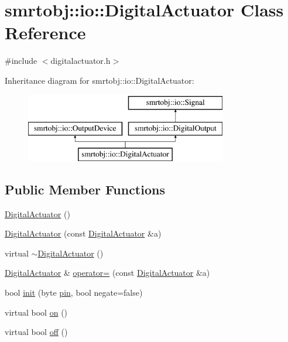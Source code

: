 \hypertarget{classsmrtobj_1_1io_1_1_digital_actuator}{}\section{smrtobj\+:\+:io\+:\+:Digital\+Actuator Class Reference}
\label{classsmrtobj_1_1io_1_1_digital_actuator}


{\ttfamily \#include $<$digitalactuator.\+h$>$}

Inheritance diagram for smrtobj\+:\+:io\+:\+:Digital\+Actuator\+:\begin{figure}[H]
\begin{center}
\leavevmode
\includegraphics[height=3.000000cm]{classsmrtobj_1_1io_1_1_digital_actuator}
\end{center}
\end{figure}
\subsection*{Public Member Functions}
\begin{DoxyCompactItemize}
\item 
\hyperlink{classsmrtobj_1_1io_1_1_digital_actuator_ad144ef7a846aaf392b5701ba3646908a}{Digital\+Actuator} ()
\item 
\hyperlink{classsmrtobj_1_1io_1_1_digital_actuator_af969dc5c7e6f6a90bacc2d927b59dd5e}{Digital\+Actuator} (const \hyperlink{classsmrtobj_1_1io_1_1_digital_actuator}{Digital\+Actuator} \&a)
\item 
virtual \hyperlink{classsmrtobj_1_1io_1_1_digital_actuator_a8b53144b2fb3c24bc37635aa5a762506}{$\sim$\+Digital\+Actuator} ()
\item 
\hyperlink{classsmrtobj_1_1io_1_1_digital_actuator}{Digital\+Actuator} \& \hyperlink{classsmrtobj_1_1io_1_1_digital_actuator_a6a8ccda71f81c0951b49ce41f3ee9781}{operator=} (const \hyperlink{classsmrtobj_1_1io_1_1_digital_actuator}{Digital\+Actuator} \&a)
\item 
bool \hyperlink{classsmrtobj_1_1io_1_1_digital_actuator_a5566c8e9f190226f3b12ad1f2c198599}{init} (byte \hyperlink{classsmrtobj_1_1io_1_1_digital_output_aef26855d23bba50d3b47ec76443fe1c9}{pin}, bool negate=false)
\item 
virtual bool \hyperlink{classsmrtobj_1_1io_1_1_digital_actuator_a2264475c4969b42e95118e73579d4d74}{on} ()
\item 
virtual bool \hyperlink{classsmrtobj_1_1io_1_1_digital_actuator_aa5b6758d4bc05c9ae9ed666d62f65958}{off} ()
\end{DoxyCompactItemize}
